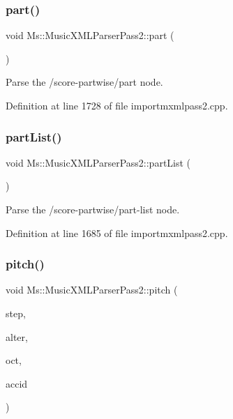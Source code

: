 \mbox{\label{class_ms_1_1_music_x_m_l_parser_pass2_aabf559efdedce1289a576e8a6f177d21}} 
\subsubsection{\texorpdfstring{part()}{part()}}
{\footnotesize\ttfamily void Ms\+::\+Music\+X\+M\+L\+Parser\+Pass2\+::part (\begin{DoxyParamCaption}{ }\end{DoxyParamCaption})}

Parse the /score-\/partwise/part node. 

Definition at line 1728 of file importmxmlpass2.\+cpp.

\mbox{\label{class_ms_1_1_music_x_m_l_parser_pass2_a7fb4aa7a1d019dfb68a66885df1b76d3}} 
\subsubsection{\texorpdfstring{part\+List()}{partList()}}
{\footnotesize\ttfamily void Ms\+::\+Music\+X\+M\+L\+Parser\+Pass2\+::part\+List (\begin{DoxyParamCaption}{ }\end{DoxyParamCaption})}

Parse the /score-\/partwise/part-\/list node. 

Definition at line 1685 of file importmxmlpass2.\+cpp.

\mbox{\label{class_ms_1_1_music_x_m_l_parser_pass2_a016fc02bae1bb7486f0b4b4ddf3b4a94}} 
\subsubsection{\texorpdfstring{pitch()}{pitch()}}
{\footnotesize\ttfamily void Ms\+::\+Music\+X\+M\+L\+Parser\+Pass2\+::pitch (\begin{DoxyParamCaption}\item[{int \&}]{step,  }\item[{int \&}]{alter,  }\item[{int \&}]{oct,  }\item[{Accidental\+Type \&}]{accid }\end{DoxyParamCaption})}

